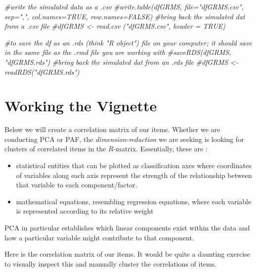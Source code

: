 \documentclass[
  english,
]{book}
\newenvironment{Shaded}{\begin{snugshade}}{\end{snugshade}}
\newcommand{\CommentTok}[1]{\textcolor[rgb]{0.56,0.35,0.01}{\textit{#1}}}
\providecommand{\tightlist}{%
  \setlength{\itemsep}{0pt}\setlength{\parskip}{0pt}}
\begin{document}
\begin{Shaded}
\begin{Highlighting}[]
\CommentTok{#write the simulated data  as a .csv}
\CommentTok{#write.table(dfGRMS, file="dfGRMS.csv", sep=",", col.names=TRUE, row.names=FALSE)}
\CommentTok{#bring back the simulated dat from a .csv file}
\CommentTok{#dfGRMS <- read.csv ("dfGRMS.csv", header = TRUE)}
\end{Highlighting}
\end{Shaded}

\begin{Shaded}
\begin{Highlighting}[]
\CommentTok{#to save the df as an .rds (think "R object") file on your computer; it should save in the same file as the .rmd file you are working with}
\CommentTok{#saveRDS(dfGRMS, "dfGRMS.rds")}
\CommentTok{#bring back the simulated dat from an .rds file}
\CommentTok{#dfGRMS <- readRDS("dfGRMS.rds")}
\end{Highlighting}
\end{Shaded}

\hypertarget{working-the-vignette}{%
\section{Working the Vignette}\label{working-the-vignette}}

Below we will create a correlation matrix of our items. Whether we are conducting PCA or PAF, the \emph{dimension-reduction} we are seeking is looking for clusters of correlated items in the \(R\)-matrix. Essentially, these are \citep{field_discovering_2012}:

\begin{itemize}
\tightlist
\item
  statistical entities that can be plotted as classification axes where coordinates of variables along each axis represent the strength of the relationship between that variable to each component/factor.
\item
  mathematical equations, resembling regression equations, where each variable is represented according to its relative weight
\end{itemize}

PCA in particular establishes which linear components exist within the data and how a particular variable might contribute to that component.

Here is the correlation matrix of our items. It would be quite a daunting exercise to visually inspect this and manually cluster the correlations of items.
\end{document}
